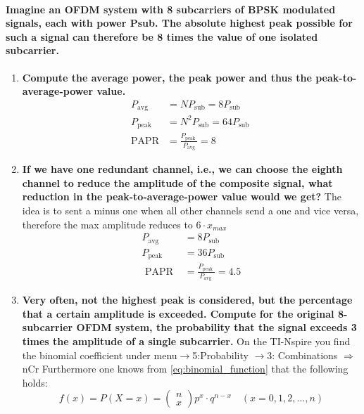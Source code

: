 \paragraph{Imagine an OFDM system with 8 subcarriers of BPSK modulated signals, each with power Psub. The absolute
highest peak possible for such a signal can therefore be 8 times the value of one isolated subcarrier.}
\begin{enumerate}
    \item \textbf{Compute the average power, the peak power and thus the peak-to-average-power value.}
    $$
\begin{aligned}
P_{\mathrm{avg}} &=N P_{\mathrm{sub}}=8 P_{\mathrm{sub}} \\
P_{\text {peak }} &=N^2 P_{\mathrm{sub}}=64 P_{\text {sub }} \\
\mathrm{PAPR} &=\frac{P_{\text {peak }}}{P_{\mathrm{avg}}}=8
\end{aligned}
$$
    \item \textbf{If we have one redundant channel, i.e., we can choose the eighth channel to reduce the amplitude of the
composite signal, what reduction in the peak-to-average-power value would we get?}\newline
The idea is to sent a minus one when all other channels send a one and vice versa, therefore the max amplitude reduces to $6\cdot x_{max}$
$$
\begin{aligned}
P_{\mathrm{avg}} &=8 P_{\mathrm{sub}} \\
P_{\text {peak }} &=36 P_{\text {sub }} \\
\text { PAPR } &=\frac{P_{\text {peak }}}{P_{\text {avg }}}=4.5
\end{aligned}
$$
\item \textbf{Very often, not the highest peak is considered, but the percentage that a certain amplitude is exceeded.
Compute for the original 8-subcarrier OFDM system, the probability that the signal exceeds 3 times the
amplitude of a single subcarrier.}\newline
On the TI-Nspire you find the binomial coefficient under menu$\rightarrow$5:Probability $\rightarrow$3: Combinations $\Rightarrow$ nCr\newline
Furthermore one knows from \autoref{eq:binomial_function} that the following holds: 
$$
    f(x)=P(X=x)=\left(\begin{array}{c}
    n \\
    x
    \end{array}\right) p^x \cdot q^{n-x} \quad(x=0,1,2, \ldots, n)
$$

\end{enumerate}
